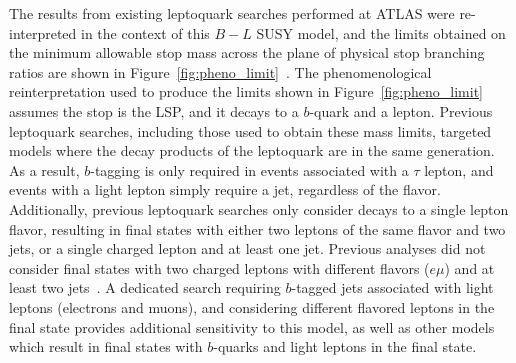 The results from existing leptoquark searches performed at ATLAS were
re-interpreted in the context of this $B-L$ SUSY model, and the
limits obtained on the minimum allowable stop mass across the plane of
physical stop branching ratios are shown in
Figure~\ref{fig:pheno_limit}~\cite{Marshall:2014cwa,Marshall:2014kea}.
The phenomenological reinterpretation used to produce the limits shown in
Figure~\ref{fig:pheno_limit} assumes the stop is the LSP, and it decays to a
$b$-quark and a lepton.
Previous leptoquark searches, including those used to obtain these mass limits,
targeted models where the decay products of the leptoquark are in the same
generation.
As a result, $b$-tagging is only required in events associated with a $\tau$
lepton, and events with a light lepton simply require a jet, regardless of the
flavor.
Additionally, previous leptoquark searches only consider decays to a single
lepton flavor, resulting in final states with either two leptons of the same
flavor and two jets, or a single charged lepton and at least one jet.
Previous analyses did not consider final states with two charged leptons
with different flavors ($e\mu$) and at least two 
jets~\cite{ATLAS:2013oea, ATLAS:2012aq, Aad:2011ch, CMS:2014qpa,
  Chatrchyan:2012sv, Chatrchyan:2012vza, Chatrchyan:2012st}.
A dedicated search requiring $b$-tagged jets associated with light leptons
(electrons and muons), and considering different flavored leptons in the final
state provides additional sensitivity to this model, as well as other models
which result in final states with $b$-quarks and light leptons in the final
state.

\begin{figure}[p]
\end{figure}

